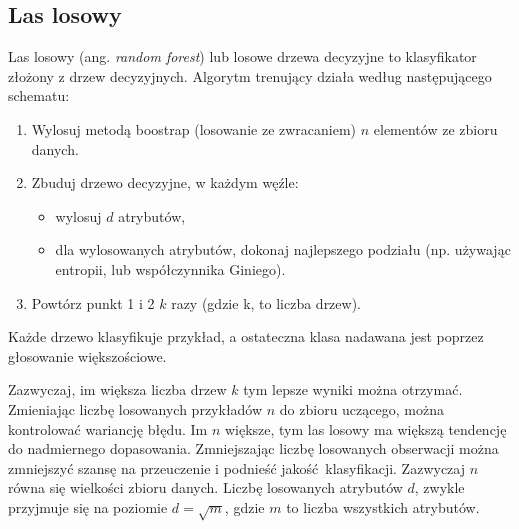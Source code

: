 \subsection{Las losowy}
Las losowy (ang. \textit{random forest}) lub losowe drzewa decyzyjne \cite{randomFc} to klasyfikator złożony z drzew decyzyjnych. Algorytm trenujący działa według następującego schematu:
\begin{enumerate}
	\item Wylosuj metodą boostrap (losowanie ze zwracaniem) $n$ elementów ze zbioru danych.
	\item Zbuduj drzewo decyzyjne, w każdym węźle:
	\begin{itemize}
		\item wylosuj $d$ atrybutów,
		\item dla wylosowanych atrybutów, dokonaj najlepszego podziału (np. używając entropii, lub współczynnika Giniego).
	\end{itemize}
	\item Powtórz punkt 1 i 2 $k$ razy (gdzie k, to liczba drzew).
\end{enumerate}
Każde drzewo klasyfikuje przykład, a ostateczna klasa nadawana jest poprzez głosowanie większościowe. \par
Zazwyczaj, im większa liczba drzew $k$ tym lepsze wyniki można otrzymać. Zmieniając liczbę losowanych przykładów $n$ do zbioru uczącego, można kontrolować wariancję błędu. Im $n$ większe, tym las losowy ma większą tendencję do nadmiernego dopasowania. Zmniejszając liczbę losowanych obserwacji można zmniejszyć szansę na przeuczenie i podnieść jakość klasyfikacji. Zazwyczaj $n$ równa się wielkości zbioru danych. Liczbę losowanych atrybutów $d$, zwykle przyjmuje się na poziomie $d = \sqrt{m}$, gdzie $m$ to liczba wszystkich atrybutów.
